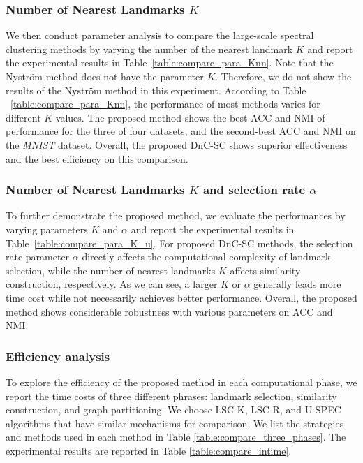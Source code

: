 \subsubsection{Number of Nearest Landmarks $K$}
\label{sec:para_K}

We then conduct parameter analysis to compare the large-scale spectral clustering methods by varying the number of the nearest landmark $K$ and report the experimental results in Table~\ref{table:compare_para_Knn}.
Note that the Nystr{\"{o}}m method does not have the parameter $K$.
Therefore, we do not show the results of the Nystr{\"{o}}m method in this experiment.
According to Table ~\ref{table:compare_para_Knn}, the performance of most methods varies for different $K$ values.
The proposed method shows the best ACC and NMI of performance for the three of four datasets, and the second-best ACC and NMI on the \emph{MNIST} dataset.
Overall, the proposed DnC-SC shows superior effectiveness and the best efficiency on this comparison.

\subsubsection{Number of Nearest Landmarks $K$ and selection rate $\alpha$}
\label{sec:para_K_u}

To further demonstrate the proposed method, we evaluate the performances by varying parameters $K$ and $\alpha$ and report the experimental results in Table~\ref{table:compare_para_K_u}.
For proposed DnC-SC methods, the selection rate parameter $\alpha$ directly affects the computational complexity of landmark selection, while the number of nearest landmarks $K$ affects similarity construction, respectively.
As we can see, a larger $K$ or $\alpha$ generally leads more time cost while not necessarily achieves better performance.
Overall, the proposed method shows considerable robustness with various parameters on ACC and NMI.

\subsubsection{Efficiency analysis}

To explore the efficiency of the proposed method in each computational phase, we report the time costs of three different phrases: landmark selection, similarity construction, and graph partitioning.
We choose LSC-K, LSC-R, and U-SPEC algorithms that have similar mechanisms for comparison.
We list the strategies and methods used in each method in Table \ref{table:compare_three_phases}.
The experimental results are reported in Table \ref{table:compare_intime}.

